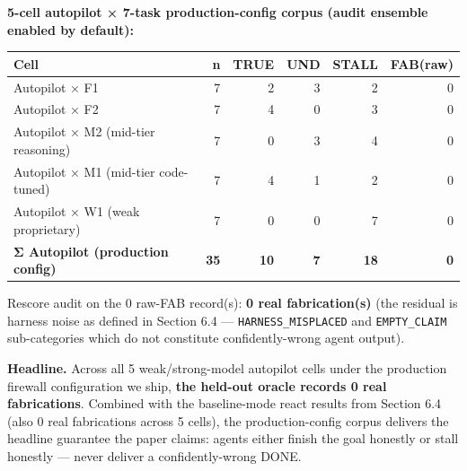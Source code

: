 \textbf{5-cell autopilot × 7-task production-config corpus (audit ensemble enabled by default):}

\begin{longtable}[]{@{}lrrrrr@{}}
\toprule\noalign{}
Cell & n & TRUE & UND & STALL & FAB(raw) \\
\midrule\noalign{}
\endhead
\bottomrule\noalign{}
\endlastfoot
Autopilot × F1 & 7 & 2 & 3 & 2 & 0 \\
Autopilot × F2 & 7 & 4 & 0 & 3 & 0 \\
Autopilot × M2 (mid-tier reasoning) & 7 & 0 & 3 & 4 & 0 \\
Autopilot × M1 (mid-tier code-tuned) & 7 & 4 & 1 & 2 & 0 \\
Autopilot × W1 (weak proprietary) & 7 & 0 & 0 & 7 & 0 \\
\textbf{Σ Autopilot (production config)} & \textbf{35} & \textbf{10} & \textbf{7} & \textbf{18} & \textbf{0} \\
\end{longtable}

Rescore audit on the 0 raw-FAB record(s): \textbf{0 real fabrication(s)}
(the residual is harness noise as defined in Section 6.4 --- \texttt{HARNESS\_MISPLACED} and
\texttt{EMPTY\_CLAIM} sub-categories which do not constitute confidently-wrong agent output).

\textbf{Headline.} Across all 5 weak/strong-model autopilot cells under the production firewall
configuration we ship, \textbf{the held-out oracle records 0 real fabrications}. Combined with
the baseline-mode react results from Section 6.4 (also 0 real fabrications across 5 cells), the
production-config corpus delivers the headline guarantee the paper claims: agents either
finish the goal honestly or stall honestly --- never deliver a confidently-wrong DONE.

